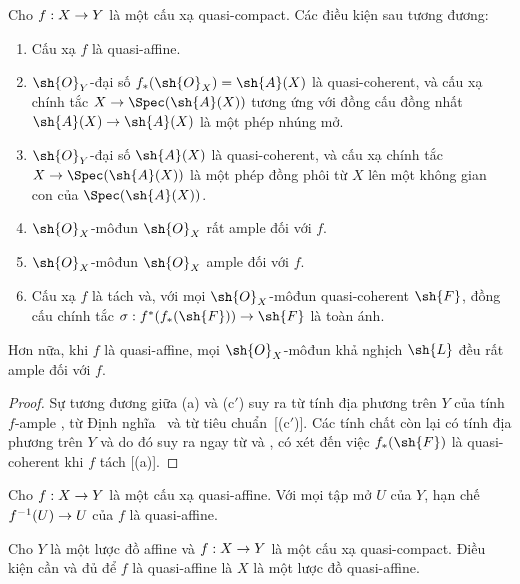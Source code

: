 \documentclass[oneside,10pt]{amsart}
\makeatletter
\newcommand{\ega@arrow}[2]{\mathchoice{#1}{#2}{#2}{#2}}
\renewcommand{\to}{\ega@arrow{\longrightarrow}{\rightarrow}}
\newcommand{\oldpage}[2][]{\marginnote{\normalfont\footnotesize\textbf{#1}~|~#2}\ignorespaces}
\let\EGAOriginalLabel\label
\renewcommand{\label}[1]{\phantomsection\EGAOriginalLabel{#1}}
\makeatother
\begin{document}
\begin{proposition}[5.1.6]
\label{II.5.1.6}
Cho $f:X\to Y$ là một cấu xạ quasi-compact.
Các điều kiện sau tương đương:
\begin{enumerate}
  \item[{\rm(a)}] Cấu xạ $f$ là quasi-affine.
  \item[{\rm(b)}] $\sh{O}_Y$-đại số $f_*(\sh{O}_X)=\sh{A}(X)$ là quasi-coherent, và cấu xạ chính tắc $X\to\Spec(\sh{A}(X))$ tương ứng với đồng cấu đồng nhất $\sh{A}(X)\to\sh{A}(X)$  là một phép nhúng mở.
  \item[{\rm(b')}] $\sh{O}_Y$-đại số $\sh{A}(X)$ là quasi-coherent, và cấu xạ chính tắc $X\to\Spec(\sh{A}(X))$ là một phép đồng phôi từ $X$ lên một không gian con của $\Spec(\sh{A}(X))$.
  \item[{\rm(c)}] $\sh{O}_X$-môđun $\sh{O}_X$ rất ample đối với $f$.
  \item[{\rm(c')}] $\sh{O}_X$-môđun $\sh{O}_X$ ample đối với $f$.
  \item[{\rm(d)}] Cấu xạ $f$ là tách và, với mọi $\sh{O}_X$-môđun quasi-coherent $\sh{F}$, đồng cấu chính tắc $\sigma:f^*(f_*(\sh{F}))\to\sh{F}$  là toàn ánh.
\end{enumerate}

Hơn nữa, khi $f$ là quasi-affine, mọi $\sh{O}_X$-môđun khả nghịch $\sh{L}$ đều rất ample đối với $f$.
\end{proposition}

\begin{proof}
Sự tương đương giữa (a) và (c$'$) suy ra từ tính địa phương trên $Y$ của tính $f$-ample , từ Định nghĩa~ và từ tiêu chuẩn~[(c$'$)].
Các tính chất còn lại có tính địa phương trên $Y$
\oldpage[II]{96}
và do đó suy ra ngay từ  và , có xét đến việc $f_*(\sh{F})$ là quasi-coherent khi $f$ tách [(a)].
\end{proof}

\begin{corollary}[5.1.7]
\label{II.5.1.7}
Cho $f:X\to Y$ là một cấu xạ quasi-affine.
Với mọi tập mở $U$ của $Y$, hạn chế $f^{-1}(U)\to U$ của $f$ là quasi-affine.
\end{corollary}

\begin{corollary}[5.1.8]
\label{II.5.1.8}
Cho $Y$ là một lược đồ affine và $f:X\to Y$ là một cấu xạ quasi-compact.
Điều kiện cần và đủ để $f$ là quasi-affine là $X$ là một lược đồ quasi-affine.
\end{corollary}
\end{document}
